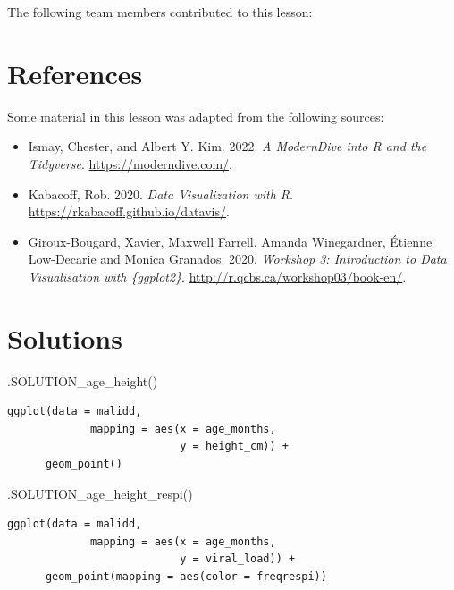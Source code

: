 \documentclass[
  letterpaper,
  DIV=11,
  numbers=noendperiod]{scrreprt}
\newenvironment{Shaded}{\begin{snugshade}}{\end{snugshade}}
\newcommand{\FunctionTok}[1]{\textcolor[rgb]{0.28,0.35,0.67}{#1}}
\newcommand{\NormalTok}[1]{\textcolor[rgb]{0.00,0.23,0.31}{#1}}
\providecommand{\tightlist}{%
  \setlength{\itemsep}{0pt}\setlength{\parskip}{0pt}}\usepackage{longtable,booktabs,array}
\begin{document}
The following team members contributed to this lesson:

\hypertarget{references-1}{%
\section*{References}\label{references-1}}


Some material in this lesson was adapted from the following sources:

\begin{itemize}
\tightlist
\item
  Ismay, Chester, and Albert Y. Kim. 2022. \emph{A ModernDive into R and
  the Tidyverse}. \url{https://moderndive.com/}.
\item
  Kabacoff, Rob. 2020. \emph{Data Visualization with R}.
  \url{https://rkabacoff.github.io/datavis/}.
\item
  Giroux-Bougard, Xavier, Maxwell Farrell, Amanda Winegardner, Étienne
  Low-Decarie and Monica Granados. 2020. \emph{Workshop 3: Introduction
  to Data Visualisation with \{ggplot2\}}.
  \url{http://r.qcbs.ca/workshop03/book-en/}.
\end{itemize}

\hypertarget{solutions-1}{%
\section{Solutions}\label{solutions-1}}

\begin{Shaded}
\begin{Highlighting}[]
\FunctionTok{.SOLUTION\_age\_height}\NormalTok{()}
\end{Highlighting}
\end{Shaded}

\begin{verbatim}
ggplot(data = malidd,
             mapping = aes(x = age_months, 
                           y = height_cm)) +
      geom_point()
\end{verbatim}

\begin{Shaded}
\begin{Highlighting}[]
\FunctionTok{.SOLUTION\_age\_height\_respi}\NormalTok{()}
\end{Highlighting}
\end{Shaded}

\begin{verbatim}
ggplot(data = malidd, 
             mapping = aes(x = age_months, 
                           y = viral_load)) + 
      geom_point(mapping = aes(color = freqrespi))
\end{verbatim}
\end{document}

